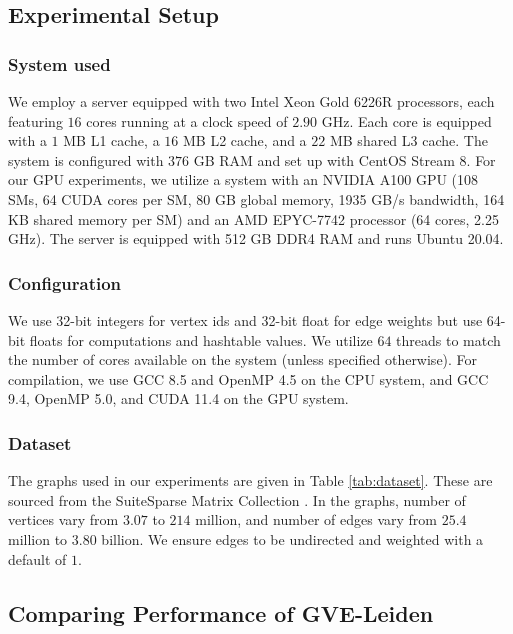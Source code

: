 \subsection{Experimental Setup}
\label{sec:setup}

\subsubsection{System used}

We employ a server equipped with two Intel Xeon Gold 6226R processors, each featuring $16$ cores running at a clock speed of $2.90$ GHz. Each core is equipped with a $1$ MB L1 cache, a $16$ MB L2 cache, and a $22$ MB shared L3 cache. The system is configured with $376$ GB RAM and set up with CentOS Stream 8. For our GPU experiments, we utilize a system with an NVIDIA A100 GPU (108 SMs, 64 CUDA cores per SM, 80 GB global memory, 1935 GB/s bandwidth, 164 KB shared memory per SM) and an AMD EPYC-7742 processor (64 cores, 2.25 GHz). The server is equipped with 512 GB DDR4 RAM and runs Ubuntu 20.04.


\subsubsection{Configuration}

We use 32-bit integers for vertex ids and 32-bit float for edge weights but use 64-bit floats for computations and hashtable values. We utilize $64$ threads to match the number of cores available on the system (unless specified otherwise). For compilation, we use GCC 8.5 and OpenMP 4.5 on the CPU system, and GCC 9.4, OpenMP 5.0, and CUDA 11.4 on the GPU system.


\subsubsection{Dataset}

The graphs used in our experiments are given in Table \ref{tab:dataset}. These are sourced from the SuiteSparse Matrix Collection \cite{suite19}. In the graphs, number of vertices vary from $3.07$ to $214$ million, and number of edges vary from $25.4$ million to $3.80$ billion. We ensure edges to be undirected and weighted with a default of $1$.








\subsection{Comparing Performance of GVE-Leiden}
\label{sec:comparison}

